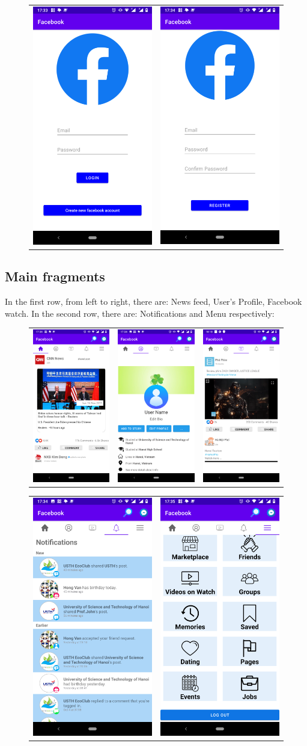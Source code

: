 \begin{figure}[h]
\begin{tabular}{c c}
        \includegraphics{Image/login_fb.png} & \includegraphics{Image/register_fb.png}
    \end{tabular}
\end{figure}
\newpage

\subsection{Main fragments}
\hspace{0.7cm}In the first row, from left to right, there are: News feed, User’s Profile, Facebook watch. In the second row, there are: Notifications and Menu respectively:

\begin{figure}[h]
\centering
    \begin{tabular}{c c c}
        \includegraphics{Image/new_feed.png} & \includegraphics{Image/profile.png} & \includegraphics{Image/watch.png}
    \end{tabular}
    \begin{tabular}{c c}
        \includegraphics{Image/notification.png} & \includegraphics{Image/menu.png}
    \end{tabular}
\end{figure}

